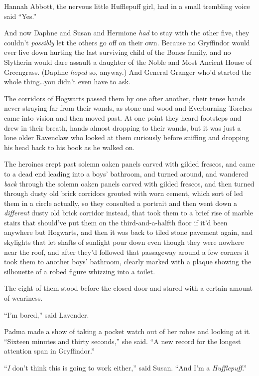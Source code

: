 Hannah Abbott, the nervous little Hufflepuff girl, had in a small trembling voice said “Yes.”

And now Daphne and Susan and Hermione \emph{had} to stay with the other five, they couldn’t \emph{possibly} let the others go off on their own. Because no Gryffindor would ever live down hurting the last surviving child of the Bones family, and no Slytherin would dare assault a daughter of the Noble and Most Ancient House of Greengrass. (Daphne \emph{hoped} so, anyway.) And General Granger who’d started the whole thing…you didn’t even have to ask.

The corridors of Hogwarts passed them by one after another, their tense hands never straying far from their wands, as stone and wood and Everburning Torches came into vision and then moved past. At one point they heard footsteps and drew in their breath, hands almost dropping to their wands, but it was just a lone older Ravenclaw who looked at them curiously before sniffing and dropping his head back to his book as he walked on.

The heroines crept past solemn oaken panels carved with gilded frescos, and came to a dead end leading into a boys’ bathroom, and turned around, and wandered \emph{back} through the solemn oaken panels carved with gilded frescos, and then turned through dusty old brick corridors grouted with worn cement, which sort of led them in a circle actually, so they consulted a portrait and then went down a \emph{different} dusty old brick corridor instead, that took them to a brief rise of marble stairs that should’ve put them on the third-and-a-halfth floor if it’d been anywhere but Hogwarts, and then it was back to tiled stone pavement again, and skylights that let shafts of sunlight pour down even though they were nowhere near the roof, and after they’d followed that passageway around a few corners it took them to another boys’ bathroom, clearly marked with a plaque showing the silhouette of a robed figure whizzing into a toilet.

The eight of them stood before the closed door and stared with a certain amount of weariness.

“I’m bored,” said Lavender.

Padma made a show of taking a pocket watch out of her robes and looking at it. “Sixteen minutes and thirty seconds,” she said. “A new record for the longest attention span in Gryffindor.”

“\emph{I} don’t think this is going to work either,” said Susan. “And I’m a \emph{Hufflepuff}.”

